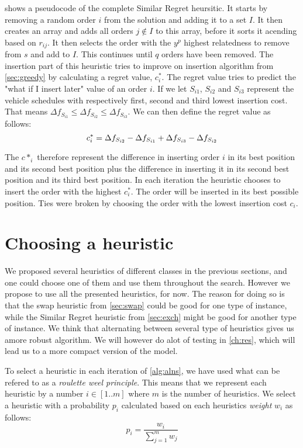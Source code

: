 \documentclass[../main.tex]{subfiles}
\begin{document}
 shows a pseudocode of the complete Similar Regret heursitic.
It starts by removing a random order $i$ from the solution and adding it to a set $I$. 
It then creates an array and adds all orders $j\not\in I$ to this array, before it sorts it acending based on $r_{ij}$.
It then selects the order with the $y^p$ highest relatedness to remove from $s$ and add to $I$. This continues until $q$ orders have been removed.
The insertion part of this heuristic tries to improve on insertion algorithm from \cref{sec:greedy} by calculating a regret value, $c^*_i$. 
The regret value tries to predict the "what if I insert later" value of an order $i$. 
If we let $S_{i1}$, $S_{i2}$ and $S_{i3}$ represent the vehicle schedules with respectively first, second and third lowest insertion cost. 
That means $\Delta f_{S_{i1}} \leq \Delta f_{S_{i2}} \leq \Delta f_{S_{i3}}$.
We can then define the regret value as follows:
\begin{equation}\label{eq:regret}
    \centering
    c^*_i=\Delta f_{S_{i2}} - \Delta f_{S_{i1}} + \Delta f_{S_{i3}} - \Delta f_{S_{i2}}
\end{equation}

The $c*_i$ therefore represent the difference in inserting order $i$ in its best position and its second best position plus the difference in inserting it in its second best position and its third best position. 
In each iteration the heuristic chooses to insert the order with the highest $c^*_i$. 
The order will be inserted in its best possible position. 
Ties were broken by choosing the order with the lowest insertion cost $c_i$.

\section{Choosing a heuristic}
\label{sec:choosing}
We proposed several heuristics of different classes in the previous sections, and one could choose one of them and use them throughout the search. 
However we propose to use all the presented heuristics, for now. 
The reason for doing so is that the swap heuristic from \cref{sec:swap} could be good for one type of instance, while the Similar Regret heuristic from \cref{sec:exch} might be good for another type of instance. 
We think that alternating between several type of heuristics gives us amore robust algorithm. 
We will however do alot of testing in \cref{ch:res}, which will lead us to a more compact version of the model. \par
To select a heuristic in each iteration of \cref{alg:alns}, we have used what can be refered to as a \emph{roulette weel principle}. 
This means that we represent each heuristic by a number $i \in [1..m]$ where $m$ is the number of heuristics. 
We select a heuristic with a probability $p_i$ calculated based on each heuristics \textit{weight} $w_i$ as follows:
\begin{equation}\label{eq:weights}
    p_i=\dfrac{w_i}{\sum_{j=1}^m w_j}
\end{equation}
\end{document}
